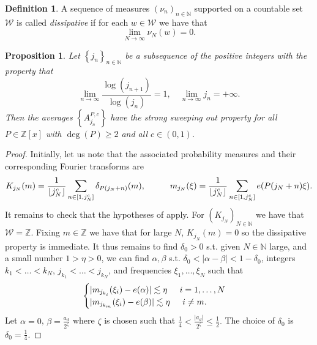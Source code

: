 \documentclass[12pt,leqno]{amsart}
\def\N {\mathbb{N}}
\def\Z {{\mathbb Z}}
\newcounter{counter}
\newcounter{counter2}
\numberwithin{equation}{section}
\numberwithin{counter2}{section}
\newtheorem{proposition}[subsection]{Proposition}
\newcounter{theorem}
\theoremstyle{definition}
\newtheorem{definition}[subsection]{Definition}
\theoremstyle{plain}
\newcommand{\floor}[1]{\left\lfloor #1 \right\rfloor}
\newcommand{\de}{\delta}
\begin{document}
	
	\begin{definition}
		A sequence of measures $\left(\nu_n\right)_{n \in \N}$ supported on a countable set $\mathcal{W}$ is called \textit{dissipative} if for each $w \in \mathcal{W}$ we have that \[ \lim_{N \to \infty} \nu_N(w)=0.  \]
	\end{definition} 
	\begin{proposition} \label{p:sweepingout}
		Let $\left\{j_n\right\}_{n \in \N}$ be a subsequence of the positive integers with the property that \[ \lim_{n \to \infty} \frac{\log\left(j_{n+1}\right)}{\log\left(j_n\right)}=1, \quad \lim_{n \to \infty} j_n=+ \infty.  \] Then the averages $\left\{A_{j_n}^{P,c}\right\} $ have the strong sweeping out property for all $P \in \Z[x]$ with $\deg(P) \geq 2$ and all $c \in (0,1).$
	\end{proposition}
	\begin{proof}
		Initially, let us note that the associated probability measures and their corresponding Fourier transforms are 
		\begin{align*}
			K_{j_N} (m) = \frac{1}{\floor{j_N^c}} \sum_{n \in [1,  j_N^c]} \de_{P(j_N + n)} (m), \hspace{.2in} \hspace{.2in} m_{j_N}(\xi) = \frac{1}{\floor{j_N^c}} \sum_{n \in [1, j_N^c]} e(P(j_N+n) \xi ) . 
		\end{align*} 	It remains to check that the hypotheses of \cite[Theorem 1.14]{SSOP_96} apply. For $\left( K_{j_N}\right)_{N \in \N}$ we have that $\mathcal{W}=\Z$.  Fixing $m \in \Z$ we have that for large $N$, $K_{j_N}(m)=0$ so the dissipative property is immediate. It thus remains to find $\delta_0>0$ s.t. given $N\in \N$ large, and a small number $1 >  \eta>0$, we can find $\alpha, \beta$ s.t. $\delta_0< |\alpha - \beta| < 1 - \delta_0$, integers $k_1< \ldots< k_N$, $j_{k_1}< \ldots < j_{k_N}$, and frequencies $\xi_1, \ldots, \xi_N$ such that 
		\begin{align*}
			\begin{cases}
				|m_{j_{k_i}} (\xi_i) - e(\alpha)| \lesssim \eta \hspace{.2in} i=1, \ldots, N\\
				|m_{j_{k_m}}(\xi_i) - e(\beta)|  \lesssim \eta \hspace{.2in} i \neq m. 
			\end{cases}
		\end{align*}
		Let $\alpha =0$, $\beta=\frac{a_d}{2^\zeta}$ where $\zeta$ is chosen such that  $  \frac{1}{4}<\frac{|a_d|}{2^\zeta} \leq \frac{1}{2}. $  The choice of $\delta_0$ is   $\delta_0 = \frac{1}{4}$.
		

\end{proof}
\end{document}
